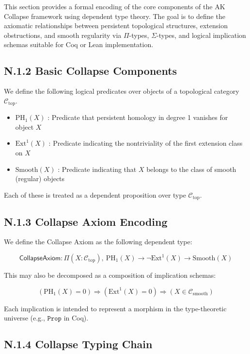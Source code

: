 \documentclass[11pt]{article}
\begin{document}
This section provides a formal encoding of the core components of the AK Collapse framework using dependent type theory.  
The goal is to define the axiomatic relationships between persistent topological structures, extension obstructions,  
and smooth regularity via $\Pi$-types, $\Sigma$-types, and logical implication schemas suitable for Coq or Lean implementation.

\subsection*{N.1.2 Basic Collapse Components}

We define the following logical predicates over objects of a topological category $\mathcal{C}_{\mathrm{top}}$.

\begin{itemize}
  \item $\mathrm{PH}_1(X)$ : Predicate that persistent homology in degree 1 vanishes for object $X$
  \item $\mathrm{Ext}^1(X)$ : Predicate indicating the nontriviality of the first extension class on $X$
  \item $\mathrm{Smooth}(X)$ : Predicate indicating that $X$ belongs to the class of smooth (regular) objects
\end{itemize}

Each of these is treated as a dependent proposition over type $\mathcal{C}_{\mathrm{top}}$.

\subsection*{N.1.3 Collapse Axiom Encoding}

We define the Collapse Axiom as the following dependent type:

\[
\textsf{CollapseAxiom} : \Pi (X : \mathcal{C}_{\mathrm{top}}),\ 
\mathrm{PH}_1(X) \rightarrow \neg \mathrm{Ext}^1(X) \rightarrow \mathrm{Smooth}(X)
\]

This may also be decomposed as a composition of implication schemas:

\[
(\mathrm{PH}_1(X) = 0) \Rightarrow (\mathrm{Ext}^1(X) = 0) \Rightarrow (X \in \mathcal{C}_{\mathrm{smooth}})
\]

Each implication is intended to represent a morphism in the type-theoretic universe (e.g., $\texttt{Prop}$ in Coq).

\subsection*{N.1.4 Collapse Typing Chain}
\end{document}
